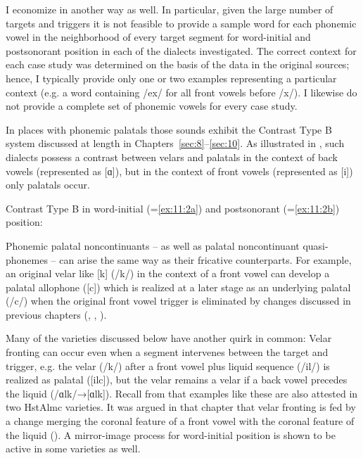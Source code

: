 I economize in another way as well. In particular, given the large number of targets and triggers it is not feasible to provide a sample word for each phonemic vowel in the neighborhood of every target segment for word-initial and postsonorant position in each of the dialects investigated. The correct context for each case study was determined on the basis of the data in the original sources; hence, I typically provide only one or two examples representing a particular context (e.g. a word containing /ex/ for all front vowels before /x/). I likewise do not provide a complete set of phonemic vowels for every case study.

In places with phonemic palatals those sounds exhibit the Contrast Type B system discussed at length in Chapters~\ref{sec:8}--\ref{sec:10}. As illustrated in , such dialects possess a contrast between velars and palatals in the context of back vowels (represented as [ɑ]), but in the context of front vowels (represented as [i]) only palatals occur.

\ea Contrast Type B in word-initial (=\ref{ex:11:2a}) and postsonorant (=\ref{ex:11:2b}) position:\label{ex:11:2}
\begin{multicols}{2}
\ea\label{ex:11:2a}
\ex\label{ex:11:2b}
\z
\end{multicols}
\z 

Phonemic palatal noncontinuants -- as well as palatal noncontinuant quasi-phonemes -- can arise the same way as their fricative counterparts. For example, an original velar like [k] (/k/) in the context of a front vowel can develop a palatal allophone ([c]) which is realized at a later stage as an underlying palatal (/c/) when the original front vowel trigger is eliminated by changes discussed in previous chapters (, , ).

Many of the varieties discussed below have another quirk in common: Velar fronting can occur even when a segment intervenes between the target and trigger, e.g. the velar (/k/) after a front vowel plus liquid sequence (/il/) is realized as palatal ([ilc]), but the velar remains a velar if a back vowel precedes the liquid (/ɑlk/→[ɑlk]). Recall from  that examples like these are also attested in two HstAlmc varieties. It was argued in that chapter that velar fronting is fed by a change merging the coronal feature of a front vowel with the coronal feature of the liquid (). A mirror-image process for word-initial position is shown to be active in some varieties as well.

